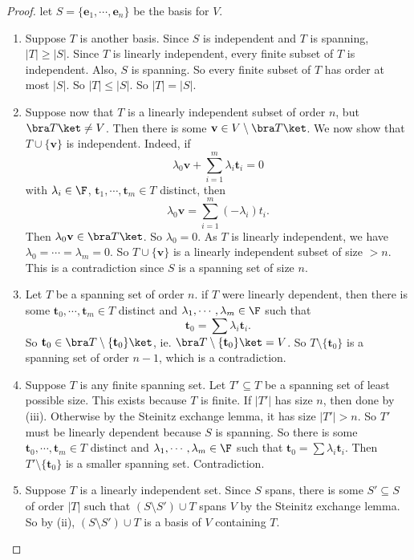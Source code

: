 \documentclass[a4paper]{article}
\begin{document}
\begin{proof}
  let $S = \{\mathbf{e}_1, \cdots, \mathbf{e}_n\}$ be the basis for $V$.
  \begin{enumerate}
    \item Suppose $T$ is another basis. Since $S$ is independent and $T$ is spanning, $|T| \geq |S|$. Since $T$ is linearly independent, every finite subset of $T$ is independent. Also, $S$ is spanning. So every finite subset of $T$ has order at most $|S|$. So $|T| \leq |S|$. So $|T| = |S|$.

    \item Suppose now that $T$ is a linearly independent subset of order $n$, but $\bra T\ket \not= V$. Then there is some $\mathbf{v} \in V\setminus \bra T\ket$. We now show that $T\cup \{\mathbf{v}\}$ is independent. Indeed, if
      \[
        \lambda_0 \mathbf{v} + \sum_{i = 1}^m \lambda_i \mathbf{t}_i = 0
      \]
      with $\lambda_i \in \F$, $\mathbf{t}_1, \cdots, \mathbf{t}_m\in T$ distinct, then
      \[
        \lambda_0 \mathbf{v} = \sum_{i = 1}^m (-\lambda_i) t_i.
      \]
      Then $\lambda_0 \mathbf{v} \in \bra T\ket$. So $\lambda_0= 0$. As $T$ is linearly independent, we have $\lambda_0 = \cdots = \lambda_m = 0$. So $T\cup \{\mathbf{v}\}$ is a linearly independent subset of size $> n$. This is a contradiction since $S$ is a spanning set of size $n$.

    \item Let $T$ be a spanning set of order $n$. if $T$ were linearly dependent, then there is some $\mathbf{t}_0, \cdots, \mathbf{t}_m \in T$ distinct and $\lambda_1, \cdots, \lambda_m \in \F$ such that
      \[
        \mathbf{t}_0 = \sum \lambda_i \mathbf{t}_i.
      \]
      So $\mathbf{t}_0 \in \bra T\setminus \{\mathbf{t}_0\}\ket$, ie. $\bra T\setminus \{\mathbf{t}_0\} \ket = V$. So $T\setminus \{\mathbf{t}_0\}$ is a spanning set of order $n - 1$, which is a contradiction.

    \item Suppose $T$ is any finite spanning set. Let $T' \subseteq T$ be a spanning set of least possible size. This exists because $T$ is finite. If $|T'|$ has size $n$, then done by (iii). Otherwise by the Steinitz exchange lemma, it has size $|T'| > n$. So $T'$ must be linearly dependent because $S$ is spanning.  So there is some $\mathbf{t}_0, \cdots, \mathbf{t}_m \in T$ distinct and $\lambda_1, \cdots, \lambda_m \in \F$ such that $\mathbf{t}_0 = \sum \lambda_i \mathbf{t}_i$. Then $T'\setminus \{\mathbf{t}_0\}$ is a smaller spanning set. Contradiction.

    \item Suppose $T$ is a linearly independent set. Since $S$ spans, there is some $S' \subseteq S$ of order $|T|$ such that $(S\setminus S')\cup T$ spans $V$ by the Steinitz exchange lemma. So by (ii), $(S\setminus S')\cup T$ is a basis of $V$ containing $T$.
  \end{enumerate}
\end{proof}
\end{document}
